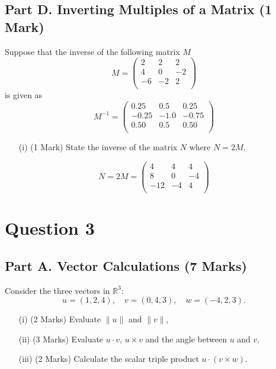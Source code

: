 \documentclass[a4paper,12pt]{article}
\begin{document}
	\subsection*{Part D. Inverting Multiples of a Matrix  (1 Mark)}	
	Suppose that the inverse of the following matrix $M$ 
	\[M = \left(\begin{array}{rrr}
	2    & 2  &  2 \\
	4    & 0 &  -2\\
	-6   & -2 &   2\\
	\end{array}\right)\]
	is given as 
		\[M^{-1} = \left(\begin{array}{rrr}
0.25 & 0.5  & 0.25\\
-0.25 & -1.0& -0.75\\
 0.50 & 0.5 & 0.50\\
		\end{array}\right)\]
		
			\begin{itemize}
				\item[(i)] (1 Mark) State the inverse of the matrix $N$ where $N = 2M$.
				\end{itemize}
	\[
	N = 2M = \left(\begin{array}{rrr}
	4 &   4  &  4 \\
	8 &   0  & -4\\
	-12 &  -4  &  4\\
	\end{array}\right)
	\]
\newpage
\section*{Question 3}
\subsection*{Part A. Vector Calculations (7 Marks)}
Consider the three vectors in $\mathbb{R}^3$:
$$
u = (1, 2, 4), \quad v = (0, 4, 3),\quad w = (-4, 2, 3).
$$
\begin{itemize}
	\item[(i)] (2 Marks) Evaluate $\|u\|$ and $\|v\|$,
	\smallskip \item[(ii)] (3 Marks) Evaluate $u\cdot v$, $u\times v$ and the angle between $u$ and $v$. %
	
	\smallskip\item[(iii)] (2 Marks) Calculate the scalar triple product  $u\cdot(v \times w)$.%

\end{itemize}
\smallskip
\end{document}
